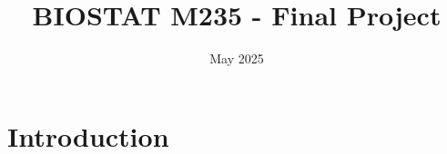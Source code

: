 \documentclass{article}
\title{BIOSTAT M235 - Final Project}
\author{}
\date{May 2025}
\begin{document}
\maketitle

\section{Introduction}
\end{document}
